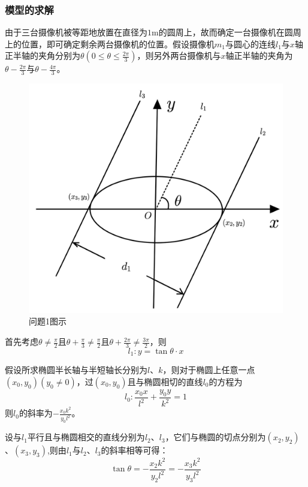 \documentclass[a4paper,10.5pt]{ctexart}
\begin{document}
\subsubsection{模型的求解}
\par 由于三台摄像机被等距地放置在直径为$1$m的圆周上，故而确定一台摄像机在圆周上的位置，即可确定剩余两台摄像机的位置。假设摄像机$m_1$与圆心的连线$l_1$与$x$轴正半轴的夹角分别为$\theta(0\le \theta \le \frac{2\pi}{3} )$，则另外两台摄像机与$x$轴正半轴的夹角为$\theta -\frac{2\pi}{3}$与$\theta -\frac{4\pi}{3}$。
\begin{figure}[h]%
\centering
\includegraphics[scale=0.17]{问题1图示.jpg}
\caption{问题1图示}
\label{fig:label}
\end{figure}
\par 首先考虑$\theta \ne \frac{\pi}{2}$且$\theta+\frac{\pi}{3} \ne \frac{\pi}{2}$且$\theta +\frac{2\pi}{3}\ne \frac{3\pi}{2}$，则$$l_1:y=\tan\theta\cdot x$$
\par 假设所求椭圆半长轴与半短轴长分别为$l$、$k$，则对于椭圆上任意一点$(x_0,y_0)(y_0\ne0)$，过$(x_0,y_0)$且与椭圆相切的直线$l_0$的方程为$$l_0:\frac{x_0x}{l^2}+\frac{y_0y}{k^2}=1$$则$l_0$的斜率为$-\frac{x_0k^2}{y_0l^2}$。
\par 设与$l_1$平行且与椭圆相交的直线分别为$l_2$、$l_3$，它们与椭圆的切点分别为$(x_2,y_2)$、$(x_3,y_3)$,则由$l_1$与$l_2$、$l_3$的斜率相等可得：
\begin{equation}
\tan\theta=-\frac{x_2k^2}{y_2l^2}=-\frac{x_3k^2}{y_3l^2}
\end{equation}
\end{document}
